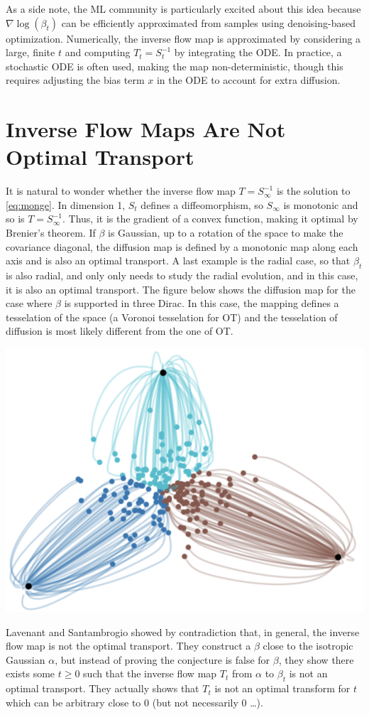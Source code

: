\documentclass{article}
\begin{document}
As a side note, the ML community is particularly excited about this idea because $\nabla \log(\beta_t)$ can be efficiently approximated from samples using denoising-based optimization. Numerically, the inverse flow map is approximated by considering a large, finite $t$ and computing $T_t = S_t^{-1}$ by integrating the ODE. In practice, a stochastic ODE is often used, making the map non-deterministic, though this requires adjusting the bias term $x$ in the ODE to account for extra diffusion.

\section{Inverse Flow Maps Are Not Optimal Transport}

It is natural to wonder whether the inverse flow map $T=S_\infty^{-1}$ is the solution to \eqref{eq:monge}. In dimension 1, $S_t$ defines a diffeomorphism, so $S_\infty$ is monotonic and so is $T=S_\infty^{-1}$. Thus, it is the gradient of a convex function, making it optimal by Brenier's theorem. If $\beta$ is Gaussian, up to a rotation of the space to make the covariance diagonal, the diffusion map is defined by a monotonic map along each axis and is also an optimal transport. A last example is the radial case, so that $\beta_t$ is also radial, and only only needs to study the radial evolution, and in this case, it is also an optimal transport.
%
The figure below shows the diffusion map for the case where $\beta$ is supported in three Dirac. In this case, the mapping defines a tesselation of the space (a Voronoi tesselation for OT) and the tesselation of diffusion is most likely different from the one of OT.   

\begin{center}
\includegraphics[width=.5\linewidth]{3-diracs.png}
\end{center}


Lavenant and Santambrogio showed by contradiction that, in general, the inverse flow map is not the optimal transport. They construct a $\beta$ close to the isotropic Gaussian $\alpha$, but instead of proving the conjecture is false for $\beta$, they show there exists some $t \geq 0$ such that the inverse flow map $T_t$ from $\alpha$ to $\beta_t$ is not an optimal transport. They actually shows that $T_t$ is not an optimal transform for $t$ which can be arbitrary close to 0 (but not necessarily 0 \ldots).
\end{document}
